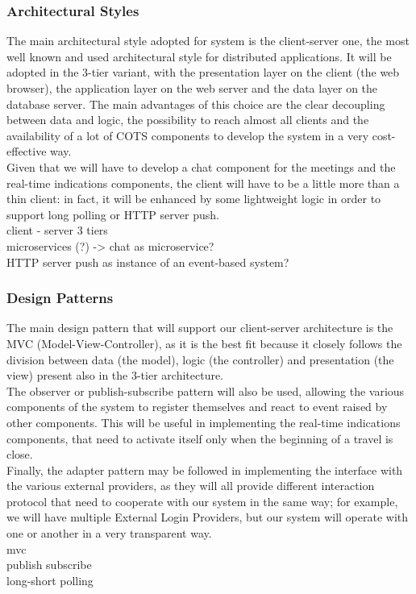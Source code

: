 \subsubsection{Architectural Styles}

The main architectural style adopted for \projectname system is the client-server one, the most well known and used architectural style for
distributed applications. It will be adopted in the 3-tier variant, with the presentation layer on the client (the web browser), the application layer on the web server and the data layer on the database server. The main advantages of this choice are the clear decoupling between data and logic, the possibility to reach almost all clients and the availability of a lot of COTS components to develop the system in a very cost-effective way. \\
Given that we will have to develop a chat component for the meetings and the real-time indications components, the client will have to be a little more than a thin client: in fact, it will be enhanced by some lightweight logic in order to support long polling or HTTP server push. \\

client - server 3 tiers \\
microservices (?) -> chat as microservice? \\
HTTP server push as instance of an event-based system?

\subsubsection{Design Patterns}

The main design pattern that will support our client-server architecture is the MVC (Model-View-Controller), as it is the best fit because it closely follows the division between data (the model), logic (the controller) and presentation (the view) present also in the 3-tier architecture. \\
The observer or publish-subscribe pattern will also be used, allowing the various components of the system to register themselves and react to event raised by other components. This will be useful in implementing the real-time indications components, that need to activate itself only when the beginning of a travel is close. \\
Finally, the adapter pattern may be followed in implementing the interface with the various external providers, as they will all provide different interaction protocol that need to cooperate with our system in the same way; for example, we will have multiple External Login Providers, but our system will operate with one or another in a very transparent way. \\

mvc \\
publish subscribe \\
long-short polling